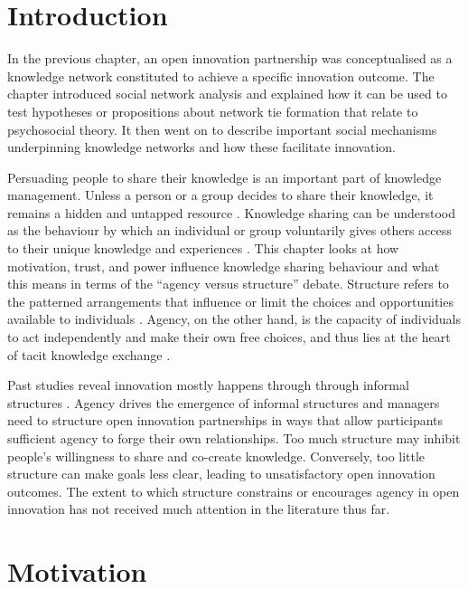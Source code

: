 
\section{Introduction}

In the previous chapter, an open innovation partnership was conceptualised as a knowledge network constituted to achieve a specific innovation outcome. The chapter introduced social network analysis and explained how it can be used to test hypotheses or propositions about network tie formation that relate to psychosocial theory. It then went on to describe important social mechanisms underpinning knowledge networks and how these facilitate innovation. \medskip

Persuading people to share their knowledge is an important part of knowledge management. Unless a person or a group decides to share their knowledge, it remains a hidden and untapped resource \citep{davenport1998working}. Knowledge sharing can be understood as the behaviour by which an individual or group voluntarily gives others access to their unique knowledge and experiences \citep{cabrera2002knowledge,hansen2005share}. This chapter looks at how motivation, trust, and power influence knowledge sharing behaviour and what this means in terms of the \enquote{agency versus structure} debate. Structure refers to the patterned arrangements that influence or limit the choices and opportunities available to individuals \citep{bandura1999social}. Agency, on the other hand, is the capacity of individuals to act independently and make their own free choices, and thus lies at the heart of tacit knowledge exchange \citep{leonard1998role,barker2016cultural}. \medskip

Past studies reveal innovation mostly happens through through informal structures \citep{allen1977role,ibarra1993network}. Agency drives the emergence of informal structures and managers need to structure open innovation partnerships in ways that allow participants sufficient agency to forge their own relationships. Too much structure may inhibit people's willingness to share and co-create knowledge. Conversely, too little structure can make goals less clear, leading to unsatisfactory open innovation outcomes. The extent to which structure constrains or encourages agency in open innovation has not received much attention in the literature thus far. \medskip

\section{Motivation}

